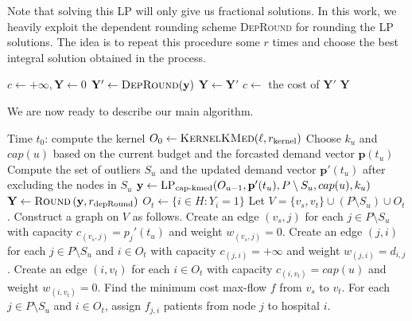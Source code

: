 Note that solving this LP will only give us  fractional solutions. In this work, we heavily exploit the dependent rounding scheme \textsc{DepRound} for rounding the LP solutions. The idea is to repeat this procedure some $r$ times and choose the best integral solution obtained in the process.

\begin{algorithm}[h]
\caption{$\textsc{Round}\left( \mathbf{y}, r \right)$}
\begin{algorithmic}[1]
\STATE $c \gets +\infty, \mathbf{Y} \gets 0$
	\STATE $\mathbf{Y}' \gets \textsc{DepRound}(\mathbf{y})$
		\STATE $\mathbf{Y} \gets \mathbf{Y}'$
		\STATE $c \gets $ the cost of $\mathbf{Y}'$
	\ENDIF
\ENDFOR
\RETURN $\mathbf{Y}$
\end{algorithmic} 
\end{algorithm}


We are now ready to describe our main algorithm.
\begin{algorithm}[h]
\caption{$\textsc{OnlineKMed} \left(H, P, \mathbf{p}, w, \ell, r_{\text{kernel}}, r_{\text{depRound}} \right)$}
\begin{algorithmic}[1]
\STATE Time $t_0$: compute the kernel $O_0 \gets \textsc{KernelKMed}(\ell, r_{\text{kernel}})$
	\STATE Choose $k_u$ and $cap(u)$ based on the current budget and the forcasted demand vector $\mathbf{p}(t_u)$
	\STATE Compute the set of outliers $S_u$ and the updated demand vector $\mathbf{p}'(t_u)$ after excluding the nodes in $S_u$
	\STATE $\mathbf{y} \gets \text{LP}_{\text{cap-kmed}}(O_{u-1}, \mathbf{p}'(t_u), P \setminus S_u, cap(u), k_u)$
	\STATE $\mathbf{Y} \gets \textsc{Round}\left( \mathbf{y}, r_{\text{depRound}} \right)$
	\STATE $O_t \gets \{i \in H: Y_i = 1\}$
	\STATE Let $V = \{v_s, v_t\} \cup (P \setminus S_u) \cup O_t$. Construct a graph on $V$ as follows.
	\STATE Create an edge $(v_s, j)$ for each $j \in P \setminus S_u$ with capacity $c_{(v_s, j)} = p_j'(t_u)$ and weight $w_{(v_s, j)} = 0$.
	\STATE Create an edge $(j, i)$ for each $j \in P \setminus S_u$ and $i \in O_t$ with capacity $c_{(j, i)} = +\infty$ and weight $w_{(j, i)} = d_{i, j}$.
	\STATE Create an edge $(i, v_t)$ for each $i \in O_t$ with capacity $c_{(i, v_t)} = cap(u)$ and weight $w_{(i, v_t)} = 0$.
	\STATE Find the minimum cost max-flow $f$ from $v_s$ to $v_t$. For each $j \in P \setminus S_u$ and $i \in O_t$, assign $f_{j,i}$ patients from node $j$ to hospital $i$.
\ENDFOR
\end{algorithmic} 
\end{algorithm}





